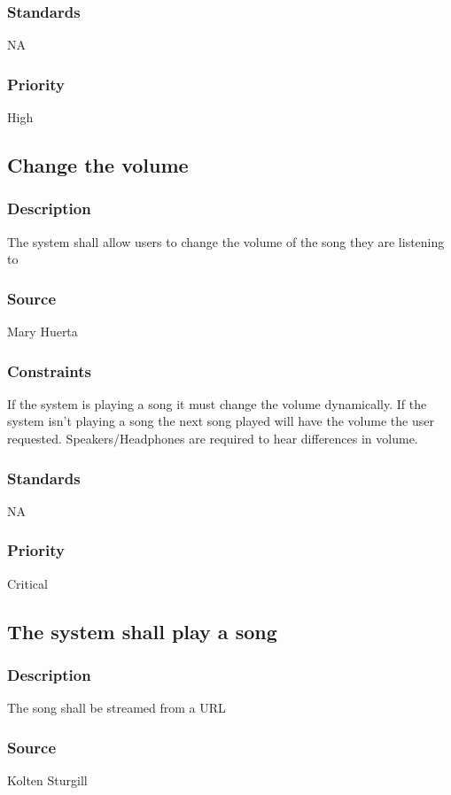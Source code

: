 \subsubsection{Standards}
NA
\subsubsection{Priority}
High



\subsection{Change the volume}
\subsubsection{Description}
The system shall allow users to change the volume of the song they are listening to
\subsubsection{Source}
Mary Huerta
\subsubsection{Constraints}
If the system is playing a song it must change the volume dynamically. If the system isn't playing a song the next song played will have the volume the user requested. Speakers/Headphones are required to hear differences in volume.
\subsubsection{Standards}
NA
\subsubsection{Priority}
Critical



\subsection{The system shall play a song }
\subsubsection{Description}
The song shall be streamed from a URL 
\subsubsection{Source}
Kolten Sturgill
